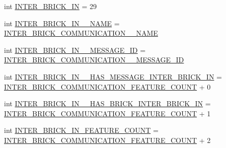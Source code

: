 \begin{DoxyCompactItemize}
\item 
int \hyperlink{interfaceshootingmachineemfmodel_1_1_shootingmachineemfmodel_package_a3d5ac7e10ace1dbdcaea8f4141f89cc0}{I\-N\-T\-E\-R\-\_\-\-B\-R\-I\-C\-K\-\_\-\-I\-N} = 29
\item 
int \hyperlink{interfaceshootingmachineemfmodel_1_1_shootingmachineemfmodel_package_ae0f1af7ad3e86470790aa63e2b001a68}{I\-N\-T\-E\-R\-\_\-\-B\-R\-I\-C\-K\-\_\-\-I\-N\-\_\-\-\_\-\-N\-A\-M\-E} = \hyperlink{interfaceshootingmachineemfmodel_1_1_shootingmachineemfmodel_package_abb5392d911aa5f7d4a788a7d7526f30b}{I\-N\-T\-E\-R\-\_\-\-B\-R\-I\-C\-K\-\_\-\-C\-O\-M\-M\-U\-N\-I\-C\-A\-T\-I\-O\-N\-\_\-\-\_\-\-N\-A\-M\-E}
\item 
int \hyperlink{interfaceshootingmachineemfmodel_1_1_shootingmachineemfmodel_package_a0094b706957a91f6475af98a5d303074}{I\-N\-T\-E\-R\-\_\-\-B\-R\-I\-C\-K\-\_\-\-I\-N\-\_\-\-\_\-\-M\-E\-S\-S\-A\-G\-E\-\_\-\-I\-D} = \hyperlink{interfaceshootingmachineemfmodel_1_1_shootingmachineemfmodel_package_a291f0af122b36942c2271b0c1b5fc389}{I\-N\-T\-E\-R\-\_\-\-B\-R\-I\-C\-K\-\_\-\-C\-O\-M\-M\-U\-N\-I\-C\-A\-T\-I\-O\-N\-\_\-\-\_\-\-M\-E\-S\-S\-A\-G\-E\-\_\-\-I\-D}
\item 
int \hyperlink{interfaceshootingmachineemfmodel_1_1_shootingmachineemfmodel_package_af781fd4b6aa6645ec9804d2866e8577e}{I\-N\-T\-E\-R\-\_\-\-B\-R\-I\-C\-K\-\_\-\-I\-N\-\_\-\-\_\-\-H\-A\-S\-\_\-\-M\-E\-S\-S\-A\-G\-E\-\_\-\-I\-N\-T\-E\-R\-\_\-\-B\-R\-I\-C\-K\-\_\-\-I\-N} = \hyperlink{interfaceshootingmachineemfmodel_1_1_shootingmachineemfmodel_package_a8d13017baf2c20e1387a03aa9657d5ff}{I\-N\-T\-E\-R\-\_\-\-B\-R\-I\-C\-K\-\_\-\-C\-O\-M\-M\-U\-N\-I\-C\-A\-T\-I\-O\-N\-\_\-\-F\-E\-A\-T\-U\-R\-E\-\_\-\-C\-O\-U\-N\-T} + 0
\item 
int \hyperlink{interfaceshootingmachineemfmodel_1_1_shootingmachineemfmodel_package_abf05108d681763ab485386ed65edaaf6}{I\-N\-T\-E\-R\-\_\-\-B\-R\-I\-C\-K\-\_\-\-I\-N\-\_\-\-\_\-\-H\-A\-S\-\_\-\-B\-R\-I\-C\-K\-\_\-\-I\-N\-T\-E\-R\-\_\-\-B\-R\-I\-C\-K\-\_\-\-I\-N} = \hyperlink{interfaceshootingmachineemfmodel_1_1_shootingmachineemfmodel_package_a8d13017baf2c20e1387a03aa9657d5ff}{I\-N\-T\-E\-R\-\_\-\-B\-R\-I\-C\-K\-\_\-\-C\-O\-M\-M\-U\-N\-I\-C\-A\-T\-I\-O\-N\-\_\-\-F\-E\-A\-T\-U\-R\-E\-\_\-\-C\-O\-U\-N\-T} + 1
\item 
int \hyperlink{interfaceshootingmachineemfmodel_1_1_shootingmachineemfmodel_package_ab53a2f7b541db62463c0c9e5a604899a}{I\-N\-T\-E\-R\-\_\-\-B\-R\-I\-C\-K\-\_\-\-I\-N\-\_\-\-F\-E\-A\-T\-U\-R\-E\-\_\-\-C\-O\-U\-N\-T} = \hyperlink{interfaceshootingmachineemfmodel_1_1_shootingmachineemfmodel_package_a8d13017baf2c20e1387a03aa9657d5ff}{I\-N\-T\-E\-R\-\_\-\-B\-R\-I\-C\-K\-\_\-\-C\-O\-M\-M\-U\-N\-I\-C\-A\-T\-I\-O\-N\-\_\-\-F\-E\-A\-T\-U\-R\-E\-\_\-\-C\-O\-U\-N\-T} + 2

\end{DoxyCompactItemize}
